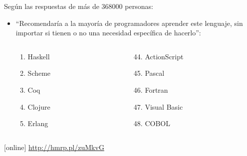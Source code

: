 \documentclass[spanish]{beamer}
\begin{document}
\begin{frame}
  Según las respuestas de más de 368000 personas:
  \begin{itemize}
  \item
    ``Recomendaría a la mayoría de programadores aprender este
    lenguaje, sin importar si tienen o no una necesidad específica de
    hacerlo'':
    \begin{columns}[T]
      \begin{column}{3cm}
        \begin{enumerate}
        \item Haskell
        \item Scheme
        \item Coq
        \item Clojure
        \item Erlang
        \end{enumerate}
      \end{column}
      \begin{column}{3cm}
        \begin{enumerate}
        \setcounter{enumi}{43}
        \item ActionScript
        \item Pascal
        \item Fortran
        \item Visual Basic
        \item COBOL
        \end{enumerate}
      \end{column}
    \end{columns}
  \end{itemize}
  \begin{thebibliography}{}
  [online]
    \newblock \url{http://hmrp.pl/zuMkvG}
  \end{thebibliography}
\end{frame}

\end{document}
